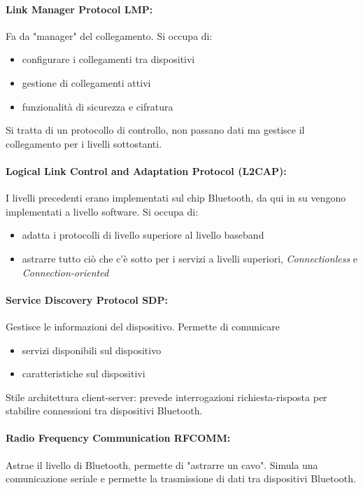 \paragraph{Link Manager Protocol LMP:} Fa da "manager" del collegamento. Si occupa di:
\begin{itemize}
	\item configurare i collegamenti tra dispositivi
	\item gestione di collegamenti attivi
	\item funzionalità di sicurezza e cifratura
\end{itemize}
Si tratta di un protocollo di controllo, non passano dati ma gestisce il collegamento per i livelli sottostanti.

\paragraph{Logical Link Control and Adaptation Protocol (L2CAP):} I livelli precedenti erano implementati sul chip Bluetooth, da qui in su vengono implementati a livello software. Si occupa di:
\begin{itemize}
	\item adatta i protocolli di livello superiore al livello baseband
	\item astrarre tutto ciò che c'è sotto per i servizi a livelli superiori, \textit{Connectionless} e \textit{Connection-oriented}
\end{itemize}

\paragraph{Service Discovery Protocol SDP:} Gestisce le informazioni del dispositivo. Permette di comunicare
\begin{itemize}
	\item servizi disponibili sul dispositivo
	\item caratteristiche sul dispositivi
\end{itemize}
Stile architettura client-server: prevede interrogazioni richiesta-risposta per stabilire connessioni tra dispositivi Bluetooth.

\paragraph{Radio Frequency Communication RFCOMM:} Astrae il livello di Bluetooth, permette di "astrarre un cavo". Simula una comunicazione seriale e permette la trasmissione di dati tra dispositivi Bluetooth.

